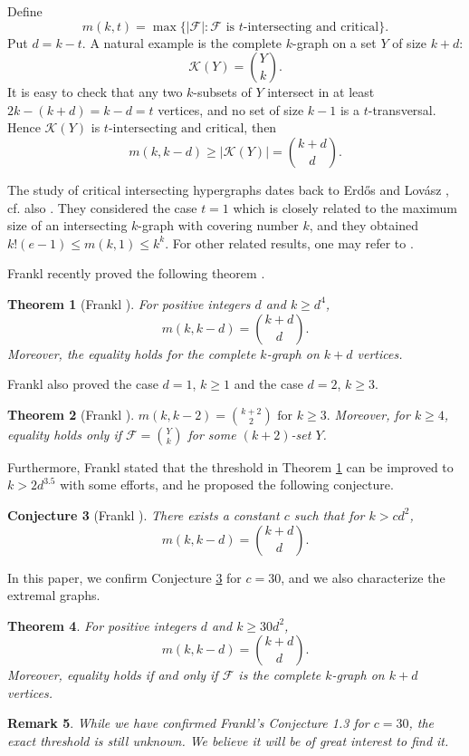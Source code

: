 \documentclass[11pt]{article}
\numberwithin{equation}{section}
\newtheorem{theorem}{Theorem}[section]
\newtheorem{conjecture}[theorem]{Conjecture}
\newtheorem{remark}[theorem]{Remark}
\begin{document}
	Define
	\[
	m(k,t)=\max\{|\mathcal F|:\mathcal F\text{ is }t\text{-intersecting and }\text{critical}\}.
	\]
	Put
	$
	d=k-t.
	$
	A natural example is the complete $k$-graph on a set $Y$ of size $k+d$:
	\[
	\mathcal K(Y)=\binom{Y}{k}.
	\]
	It is easy to check that any two $k$-subsets of $Y$ intersect in at least
	$
	2k-(k+d)=k-d=t
	$
	vertices, and no set of size $k-1$ is a $t$-transversal. Hence $\mathcal K(Y)$ is $t\text{-intersecting and }\text{critical}$, then
	\[
	m(k,k-d)\ge |\mathcal K(Y)|=\binom{k+d}{d}.
	\]
	
	The study of critical intersecting hypergraphs dates back to Erd\H{o}s and Lov\'asz \cite{EL}, cf. also \cite{Lovasz1975}.  They considered the case $t=1$ which is closely related to the maximum size of an intersecting $k$-graph with covering number $k$, and they obtained   $k!(e-1)\le m(k,1)\le k^k$.
 For other related results, one may refer to \cite{Tuza,AT,Frankl2019,Zakharov2024, FOT1996}.
	
	
	 Frankl recently proved the following theorem \cite{FranklCritical}.
	\begin{theorem}[Frankl \cite{FranklCritical}] \label{FranklCritical}
		For positive integers $d$ and $k\ge d^4$,
		$$
		m(k,k-d)=\binom{k+d}{d}.
		$$
		Moreover, the equality holds for the complete $k$-graph on $k+d$ vertices.
		\end{theorem}
	
	 Frankl also  proved the case $d=1$, $k\ge 1$ and the case $d=2$, $k\ge3$.
	 \begin{theorem}[Frankl \cite{FranklCritical}]
	 	$m(k, k-2) = \binom{k+2}{2} \text{ for } k \ge 3.$
	 	Moreover,  for $k \ge 4$,  equality holds only if $\mathcal{F} = \binom{Y}{k}$ for some $(k+2)$-set $Y$.
	 \end{theorem}
	
	 Furthermore, Frankl \cite{FranklCritical} stated that the threshold in Theorem  \ref{FranklCritical} can be improved to $k>2d^{3.5}$ with some efforts,  and he proposed the following conjecture.
	 \begin{conjecture}[Frankl \cite{FranklCritical}] \label{ConjF}
	 	There exists a constant $c$ such that for $k>c d^2$,
	 	\[
	 	m(k,k-d)=\binom{k+d}{d}.
	 	\]
	 \end{conjecture}
In this paper, we confirm
	  Conjecture \ref{ConjF}   for $c=30$,  and we also characterize  the extremal graphs.
	\begin{theorem}\label{thm:main}
		For positive integers $d$ and $k\ge30d^2$,
		\[
		m(k,k-d)=  \binom{k+d}{d}.
		\]
		Moreover, equality holds if and only if $\mathcal F$ is the complete $k$-graph on $k+d$ vertices.
	\end{theorem}
\begin{remark}
	While we have confirmed Frankl's Conjecture 1.3 for $c=30$, the exact threshold is still unknown. We believe it will be of great interest to find it.
\end{remark}
\end{document}
